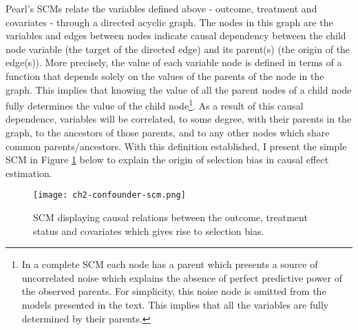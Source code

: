 \documentclass[../main.tex]{subfiles}
\begin{document}
\vspace{\baselineskip}
Pearl’s SCMs relate the variables defined above - outcome, treatment and covariates - through a directed acyclic graph. The nodes in this graph are the variables and edges between nodes indicate causal dependency between the child node variable (the target of the directed edge) and its parent(s) (the origin of the edge(s)). More precisely, the value of each variable node is defined in terms of a function that depends solely on the values of the parents of the node in the graph. This implies that knowing the value of all the parent nodes of a child node fully determines the value of the child node\footnote{ In a complete SCM each node has a parent which presents a source of uncorrelated noise which explains the absence of perfect predictive power of the observed parents. For simplicity, this noise node is omitted from the models presented in the text. This implies that all the variables are fully determined by their parents. }. As a result of this causal dependence, variables will be correlated, to some degree, with their parents in the graph, to the ancestors of those parents, and to any other nodes which share common parents/ancestors. With this definition established, I present the simple SCM in Figure \ref{fig:confounder-scm} below to explain the origin of selection bias in causal effect estimation.\par

\begin{figure}[ht!]
    \centering
    \texttt{[image: ch2-confounder-scm.png]}
    \caption{SCM displaying causal relations between the outcome, treatment status and covariates which gives rise to selection bias.}
    \label{fig:confounder-scm}
\end{figure}
\end{document}
